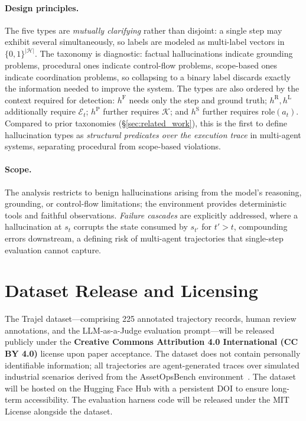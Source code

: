 \documentclass{article}
\begin{document}
\paragraph{Design principles.}
The five types are \emph{mutually clarifying} rather than disjoint: a single step may exhibit several simultaneously, so labels are modeled as multi-label vectors in $\{0,1\}^{|\mathcal{H}|}$. The taxonomy is diagnostic: factual hallucinations indicate grounding problems, procedural ones indicate control-flow problems, scope-based ones indicate coordination problems, so collapsing to a binary label discards exactly the information needed to improve the system. The types are also ordered by the context required for detection: $h^{\text{F}}$ needs only the step and ground truth; $h^{\text{R}}, h^{\text{L}}$ additionally require $\mathcal{E}_t$; $h^{\text{P}}$ further requires $\mathcal{K}$; and $h^{\text{S}}$ further requires $\mathrm{role}(a_t)$. Compared to prior taxonomies (\S\ref{sec:related_work}), this is the first to define hallucination types as \emph{structural predicates over the execution trace} in multi-agent systems, separating procedural from scope-based violations.

\paragraph{Scope.}
The analysis restricts to benign hallucinations arising from the model's reasoning, grounding, or control-flow limitations; the environment provides deterministic tools and faithful observations. \emph{Failure cascades} are explicitly addressed, where a hallucination at $s_t$ corrupts the state consumed by $s_{t'}$ for $t' > t$, compounding errors downstream, a defining risk of multi-agent trajectories that single-step evaluation cannot capture.

\section*{Dataset Release and Licensing}
\label{sec:release}

The Trajel dataset---comprising 225 annotated trajectory records, human review annotations, and the LLM-as-a-Judge evaluation prompt---will be released publicly under the \textbf{Creative Commons Attribution 4.0 International (CC BY 4.0)} license upon paper acceptance. The dataset does not contain personally identifiable information; all trajectories are agent-generated traces over simulated industrial scenarios derived from the AssetOpsBench environment~\cite{assetopsbench}. The dataset will be hosted on the Hugging Face Hub with a persistent DOI to ensure long-term accessibility. The evaluation harness code will be released under the MIT License alongside the dataset.
\end{document}
